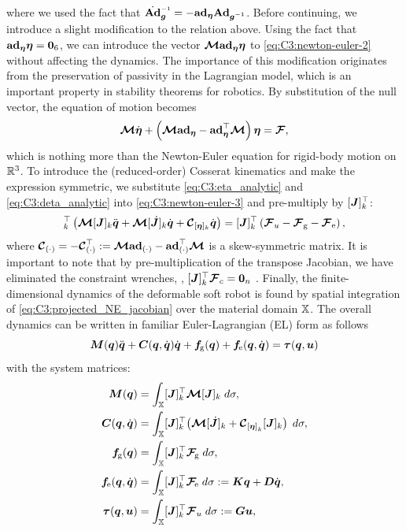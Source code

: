 %
where we used the fact that $\dot{\Ad}_{\vec{g}} \inv = -\ad_{\vec{\eta}} {\Ad}_{\vec{g} \inv}$. Before continuing, we introduce a slight modification to the relation above. Using the fact that $\textbf{ad}_{\boldsymbol{\eta}} \boldsymbol{\eta} = \boldsymbol{0}_6$, we can introduce the vector
$\boldsymbol{\mathcal{M}} \textbf{ad}_{\boldsymbol{\eta}} \boldsymbol{\eta}$ to \eqref{eq:C3:newton-euler-2} without affecting the dynamics. The importance of this modification originates from the preservation of passivity in the Lagrangian model, which is an important property in stability theorems for robotics. By substitution of the null vector, the equation of motion becomes
%
\begin{equation}
  {\boldsymbol{\mathcal{M}}} \dot{\boldsymbol{\eta}} + \left({\boldsymbol{\mathcal{M}}} \textbf{ad}_{\boldsymbol{\eta}}  - \textbf{ad}_{\boldsymbol{\eta}} ^\top {\boldsymbol{\mathcal{M}}} \right) \boldsymbol{\eta} = {\boldsymbol{\mathcal{F}}},
  \label{eq:C3:newton-euler-3}
\end{equation}
%
which is nothing more than the Newton-Euler equation for rigid-body motion on $\mathbb{R}^3$. To introduce the (reduced-order) Cosserat kinematics and make the expression symmetric, we substitute \eqref{eq:C3:eta_analytic} and \eqref{eq:C3:deta_analytic} into \eqref{eq:C3:newton-euler-3} and pre-multiply by $[{\boldsymbol{J}}]_k^\top$:
%
\begin{multline}
  [\vec{J}]_k^\top \left( \MT [\mat{J}]_k \ddot{\vec{q}} + \MT [\dJB]_k\dot{\vec{q}} + \CT_{[\vec{\eta}]_k }\dot{\vec{q}}\right) = [\mat{J}]_k^\top \left(\FT_u - \FT\grav - \FT\elastic \right),
  \label{eq:C3:projected_NE_jacobian}
\end{multline}
%
where ${\boldsymbol{\mathcal{C}}}_{(\cdot)} = -{\boldsymbol{\mathcal{C}}}_{(\cdot)} ^\top :=  {\boldsymbol{\mathcal{M}}} \textbf{ad}_{(\cdot)}  - \textbf{ad}_{(\cdot)} ^\top {\boldsymbol{\mathcal{M}}}$ is a skew-symmetric matrix. It is important to note that by pre-multiplication of the transpose Jacobian, we have eliminated the constraint wrenches, \ie, $[{\boldsymbol{J}}]_k^\top {\boldsymbol{\mathcal{F}}}_c = \boldsymbol{0}_n$ \cite{Murray1994}. Finally, the finite-dimensional dynamics of the deformable soft robot is found by spatial integration of \eqref{eq:C3:projected_NE_jacobian} over the material domain $\mathbb{X}$. The overall dynamics can be written in familiar Euler-Lagrangian (EL) form as follows
%
\begin{equation}
  \boldsymbol{M}(\boldsymbol{q})\ddot{\boldsymbol{q}} + \boldsymbol{C}(\boldsymbol{q},\dot{\boldsymbol{q}})\dot{\boldsymbol{q}} + \boldsymbol{f}\!_{\scriptstyle\textrm{g}}(\boldsymbol{q}) + \boldsymbol{f}\!_{\scriptstyle\textrm{e}}(\boldsymbol{q},\dot{\boldsymbol{q}}) = \boldsymbol{\tau}(\boldsymbol{q},{\boldsymbol{u}})
  \label{eq:C3:dyn_model_lag}
\end{equation}
%
with the system matrices:
%
\begin{align}
 {\boldsymbol{M}}({\boldsymbol{q}}) & = \int_{\mathbb{X}} [\boldsymbol{J}]_k^\top \boldsymbol{\mathcal{M}} [\boldsymbol{J}]_k \; d \sigma, \label{eq:C3:lag_M} \\
 \boldsymbol{C}({\boldsymbol{q}},{\dot{\boldsymbol{q}}}) & = \int_{\mathbb{X}} [{\boldsymbol{J}}]_k^\top \!\left(\boldsymbol{\mathcal{M}} [\,\,\dot{\!\!\boldsymbol{J}}]_k + \boldsymbol{\mathcal{C}}_{{[\boldsymbol{\eta}]}_k}[\boldsymbol{J}]_k \right) \; d \sigma, \label{eq:C3:lag_C} \\
\boldsymbol{f}\!_{\scriptstyle\textrm{g}}({\boldsymbol{q}}) & = \int_{\mathbb{X}} [{\boldsymbol{J}}]_k^\top \boldsymbol{\mathcal{F}}\!_{\scriptstyle\textrm{g}} \; d \sigma, \\
\boldsymbol{f}\!_{\scriptstyle\textrm{e}}({\boldsymbol{q}},{\dot{\boldsymbol{q}}}) & = \int_{\mathbb{X}} [{\boldsymbol{J}}]_k^\top \boldsymbol{\mathcal{F}}\!_{\scriptstyle\textrm{e}} \; d \sigma := \boldsymbol{K}\boldsymbol{q} + \boldsymbol{D}\dot{\boldsymbol{q}},
\label{eq:C3:lag_G} \\
\boldsymbol{\tau}({\boldsymbol{q}},{\boldsymbol{u}}) & = \int_{\mathbb{X}} [\boldsymbol{J}]_k^\top \boldsymbol{\mathcal{F}}_u \; d\sigma := \boldsymbol{G} \boldsymbol{u}, \label{eq:C3:lag_tau}
\end{align}
